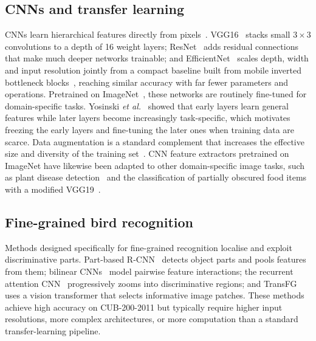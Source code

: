 \documentclass[conference]{IEEEtran}
\begin{document}
\subsection{CNNs and transfer learning}
CNNs learn hierarchical features directly from pixels~\cite{krizhevsky2012}.
VGG16~\cite{simonyan2015} stacks small $3\times3$ convolutions to a depth of 16
weight layers; ResNet~\cite{he2016} adds residual connections that make much
deeper networks trainable; and EfficientNet~\cite{tan2019} scales depth, width
and input resolution jointly from a compact baseline built from mobile inverted
bottleneck blocks~\cite{sandler2018}, reaching similar accuracy with far fewer
parameters and operations. Pretrained on ImageNet~\cite{deng2009}, these networks
are routinely fine-tuned for domain-specific tasks. Yosinski
\emph{et al.}~\cite{yosinski2014} showed that early layers learn general features
while later layers become increasingly task-specific, which motivates freezing
the early layers and fine-tuning the later ones when training data are scarce.
Data augmentation is a standard complement that increases the effective size and
diversity of the training set~\cite{shorten2019}. CNN feature extractors pretrained
on ImageNet have likewise been adapted to other domain-specific image tasks, such
as plant disease detection~\cite{sravanthi2025plant} and the classification of
partially obscured food items with a modified VGG19~\cite{sravanthi2026vgg19}.

\subsection{Fine-grained bird recognition}
Methods designed specifically for fine-grained recognition localise and exploit
discriminative parts. Part-based R-CNN~\cite{zhang2014} detects object parts and
pools features from them; bilinear CNNs~\cite{lin2015} model pairwise feature
interactions; the recurrent attention CNN~\cite{fu2017} progressively zooms into
discriminative regions; and TransFG~\cite{he2022} uses a vision transformer that
selects informative image patches. These methods achieve high accuracy on
CUB-200-2011 but typically require higher input resolutions, more complex
architectures, or more computation than a standard transfer-learning pipeline.
\end{document}
